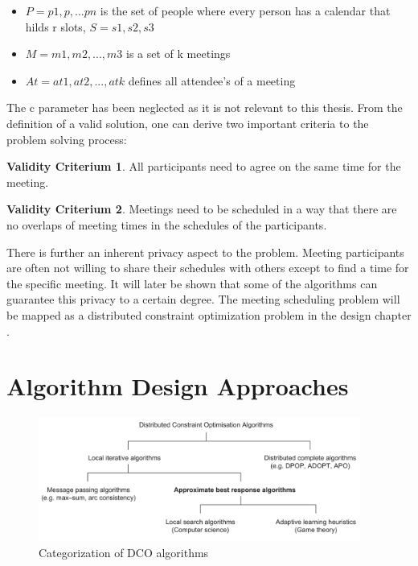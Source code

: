 \begin{itemize}
\item \(P = {p1, p, ... pn}\) is the set of people where every person has a calendar that hilds r slots, \(S = {s1,s2,s3}\)
\item \(M = {m1, m2, ..., m3}\) is a set of k meetings
\item \(At = {at1, at2, ..., atk}\) defines all attendee's of a meeting
\end{itemize}

The c parameter has been neglected as it is not relevant to this thesis. From the definition of a valid solution, one can derive two important criteria to the problem solving process:
\theoremstyle{definition}
\newtheorem{hardconstraint1}{Validity Criterium}
\begin{hardconstraint1}
All participants need to agree on the same time for the meeting.
\end{hardconstraint1}
\begin{hardconstraint1}
Meetings need to be scheduled in a way that there are no overlaps of meeting times in the schedules of the participants.
\end{hardconstraint1}
    
There is further an inherent privacy aspect to the problem. Meeting participants are often not willing to share their schedules with others except to find a time for the specific meeting. It will later be shown that some of the algorithms can guarantee this privacy to a certain degree. The meeting scheduling problem will be mapped as a distributed constraint optimization problem in the design chapter \cite{Farinelli} \cite{Scheduling}.
    
\section{Algorithm Design Approaches}

\begin{figure}[h]
\includegraphics[width=400px]{graphics/overview_algos}
\caption{Categorization of DCO algorithms \cite{Chapman2011}}
\label{fig:categorization}
\end{figure}

